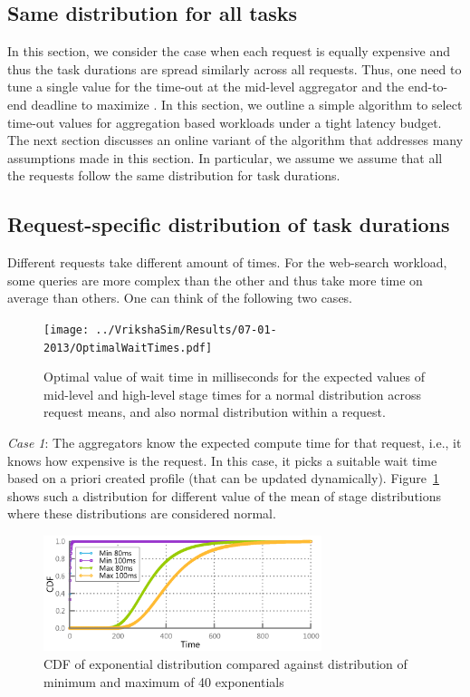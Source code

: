 \documentclass[letterpaper,twocolumn,10pt]{article}
\begin{document}
\subsection{Same distribution for all tasks}
In this section, we consider the case when each request is equally expensive and thus the task durations are spread similarly across all requests. Thus, one need to tune a single value for the time-out at the mid-level aggregator and the end-to-end deadline to maximize . 
In this section, we outline a simple algorithm to select time-out values for aggregation based workloads under a tight latency budget. The next section discusses an online variant of the algorithm that addresses many assumptions made in this section. In particular, we assume we assume that all the requests follow the same distribution for task durations.


\subsection{Request-specific distribution of task durations}
Different requests take different amount of times. 
For the web-search workload, some queries are more complex than the 
other and thus take more time on average than others. 
One can think of the following two cases.

\begin{figure}[t]
\centering
\texttt{[image: ../VrikshaSim/Results/07-01-2013/OptimalWaitTimes.pdf]}
\caption{\small Optimal value of wait time in milliseconds for the expected values of mid-level and high-level stage times for a normal distribution across request means, and also normal distribution within a request.}
\label{figure:OptimalWaitTimes}
\end{figure}

\emph{Case 1}: The aggregators know the expected compute time for that request, i.e., it knows how expensive is the request. In this case, it picks a suitable wait time based on a priori created profile (that can be updated dynamically).
Figure~\ref{figure:OptimalWaitTimes} shows such a distribution for different value of the mean of stage distributions where these distributions are considered normal.

\begin{figure}[t]
\centering
\includegraphics[width=3.2in]{Matplotlib/MinMaxExponentials.pdf}
\caption{\small CDF of exponential distribution compared against distribution of minimum and maximum of 40 exponentials}
\label{figure:MinMaxExponentials}
\end{figure}
\end{document}
